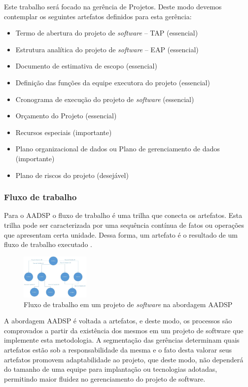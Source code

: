 \documentclass{acm_proc_article-sp}
\begin{document}
Este trabalho será focado na gerência de Projetos. Deste modo devemos contemplar os seguintes artefatos definidos para esta gerência:

\begin{itemize}
\item Termo de abertura do  projeto de \textit{software} – TAP (essencial)
\item Estrutura analítica do projeto de \textit{software} – EAP (essencial)
\item Documento de estimativa de escopo (essencial)
\item Definição das funções da equipe executora do projeto (essencial)
\item Cronograma de execução do projeto de \textit{software} (essencial)
\item Orçamento do Projeto (essencial)
\item Recursos especiais (importante)
\item Plano organizacional de dados ou Plano de gerenciamento de dados  (importante)
\item Plano de riscos do projeto (desejável)
\end{itemize}

\subsubsection*{Fluxo de trabalho}
Para o AADSP o fluxo de trabalho é uma trilha que conecta os artefatos. Esta trilha pode ser caracterizada por uma sequência contínua de fatos ou operações que apresentam certa unidade. Dessa forma, um artefato é o resultado de um fluxo de trabalho executado \cite{aadsp:hibirdo}.

\begin{figure}[h]
\centering %
\includegraphics[width=0.3\textwidth]{AADSP_fluxo_de_trabalho.jpg} %
\caption{Fluxo de trabalho em um projeto de \textit{software} na abordagem AADSP  \cite{aadsp:hibirdo}}
\end{figure}

A abordagem AADSP é voltada a artefatos, e deste modo, os processos são comprovados a partir da existência dos mesmos em um projeto de software que implemente esta metodologia. A segmentação das gerências determinam quais artefatos estão sob a responsabilidade da mesma e o fato desta valorar seus artefatos promovem adaptabilidade ao projeto, que deste modo, não dependerá do tamanho de uma equipe para implantação ou tecnologias adotadas, permitindo maior fluidez no gerenciamento do projeto de software.
\end{document}
